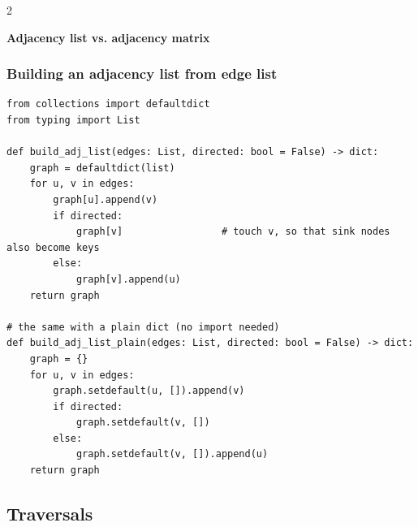 \documentclass[9pt,a4paper]{extarticle}
\newlength{\tw}
\begin{document}
\begin{multicols}{2}

\needspace{\dimexpr\ht\tblbox+\dp\tblbox+4.1\baselineskip\relax}

\noindent\textbf{Adjacency list vs. adjacency matrix}\par\nopagebreak\vspace{1pt}

\usebox{\tblbox}\smallskip

\subsubsection{Building an adjacency list from edge list}

\begin{lstlisting}
from collections import defaultdict
from typing import List

def build_adj_list(edges: List, directed: bool = False) -> dict:
    graph = defaultdict(list)
    for u, v in edges:
        graph[u].append(v)
        if directed:
            graph[v]                 # touch v, so that sink nodes also become keys
        else:
            graph[v].append(u)
    return graph

# the same with a plain dict (no import needed)
def build_adj_list_plain(edges: List, directed: bool = False) -> dict:
    graph = {}
    for u, v in edges:
        graph.setdefault(u, []).append(v)
        if directed:
            graph.setdefault(v, [])
        else:
            graph.setdefault(v, []).append(u)
    return graph
\end{lstlisting}

\subsection{Traversals}


\end{multicols}
\end{document}
